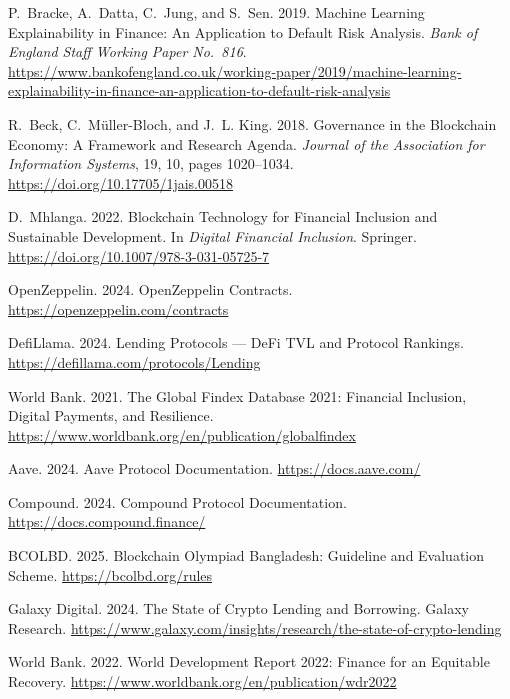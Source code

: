 \documentclass[12pt,a4paper]{report}
\begin{document}
{\begin{enumerate}[label={[\arabic*]}]
\item P.~Bracke, A.~Datta, C.~Jung, and S.~Sen. 2019. Machine Learning Explainability in Finance: An Application to Default Risk Analysis. \emph{Bank of England Staff Working Paper No.~816}. \url{https://www.bankofengland.co.uk/working-paper/2019/machine-learning-explainability-in-finance-an-application-to-default-risk-analysis}

\item R.~Beck, C.~M\"{u}ller-Bloch, and J.~L. King. 2018. Governance in the Blockchain Economy: A Framework and Research Agenda. \emph{Journal of the Association for Information Systems}, 19, 10, pages 1020--1034. \url{https://doi.org/10.17705/1jais.00518}

\item D.~Mhlanga. 2022. Blockchain Technology for Financial Inclusion and Sustainable Development. In \emph{Digital Financial Inclusion}. Springer. \url{https://doi.org/10.1007/978-3-031-05725-7}

\item OpenZeppelin. 2024. OpenZeppelin Contracts. \url{https://openzeppelin.com/contracts}

\item DefiLlama. 2024. Lending Protocols --- DeFi TVL and Protocol Rankings. \url{https://defillama.com/protocols/Lending}

\item World Bank. 2021. The Global Findex Database 2021: Financial Inclusion, Digital Payments, and Resilience. \url{https://www.worldbank.org/en/publication/globalfindex}

\item Aave. 2024. Aave Protocol Documentation. \url{https://docs.aave.com/}

\item Compound. 2024. Compound Protocol Documentation. \url{https://docs.compound.finance/}

\item BCOLBD. 2025. Blockchain Olympiad Bangladesh: Guideline and Evaluation Scheme. \url{https://bcolbd.org/rules}

\item Galaxy Digital. 2024. The State of Crypto Lending and Borrowing. Galaxy Research. \url{https://www.galaxy.com/insights/research/the-state-of-crypto-lending}

\item World Bank. 2022. World Development Report 2022: Finance for an Equitable Recovery. \url{https://www.worldbank.org/en/publication/wdr2022}


\end{enumerate}}
\end{document}
